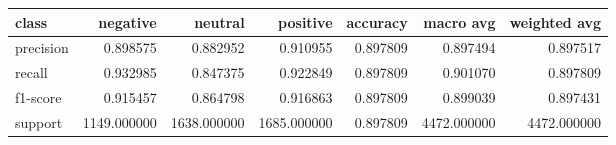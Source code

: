 \begin{tabular}{lrrrrrr}
\toprule
class & negative & neutral & positive & accuracy & macro avg & weighted avg \\
\midrule
precision & 0.898575 & 0.882952 & 0.910955 & 0.897809 & 0.897494 & 0.897517 \\
recall & 0.932985 & 0.847375 & 0.922849 & 0.897809 & 0.901070 & 0.897809 \\
f1-score & 0.915457 & 0.864798 & 0.916863 & 0.897809 & 0.899039 & 0.897431 \\
support & 1149.000000 & 1638.000000 & 1685.000000 & 0.897809 & 4472.000000 & 4472.000000 \\
\bottomrule
\end{tabular}
